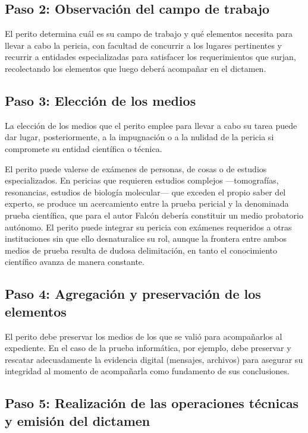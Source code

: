 \documentclass[12pt,oneside]{book}
\begin{document}
\subsection{Paso 2: Observación del campo de trabajo}

El perito determina cuál es su campo de trabajo y qué elementos necesita para llevar a cabo la pericia, con facultad de concurrir a los lugares pertinentes y recurrir a entidades especializadas para satisfacer los requerimientos que surjan, recolectando los elementos que luego deberá acompañar en el dictamen.

\subsection{Paso 3: Elección de los medios}

\begin{important}
La elección de los medios que el perito emplee para llevar a cabo su tarea puede dar lugar, posteriormente, a la impugnación o a la nulidad de la pericia si compromete su entidad científica o técnica.
\end{important}

El perito puede valerse de exámenes de personas, de cosas o de estudios especializados. En pericias que requieren estudios complejos —tomografías, resonancias, estudios de biología molecular— que exceden el propio saber del experto, se produce un acercamiento entre la prueba pericial y la denominada prueba científica, que para el autor Falcón debería constituir un medio probatorio autónomo. El perito puede integrar su pericia con exámenes requeridos a otras instituciones sin que ello desnaturalice su rol, aunque la frontera entre ambos medios de prueba resulta de dudosa delimitación, en tanto el conocimiento científico avanza de manera constante.

\subsection{Paso 4: Agregación y preservación de los elementos}

El perito debe preservar los medios de los que se valió para acompañarlos al expediente. En el caso de la prueba informática, por ejemplo, debe preservar y rescatar adecuadamente la evidencia digital (mensajes, archivos) para asegurar su integridad al momento de acompañarla como fundamento de sus conclusiones.

\subsection{Paso 5: Realización de las operaciones técnicas y emisión del dictamen}
\end{document}
